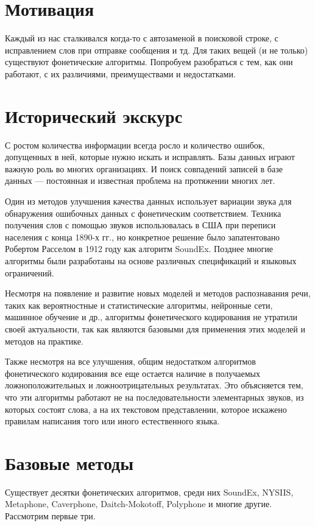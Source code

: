 \documentclass[titlepage,12pt]{article}
\begin{document}
\tableofcontents
\newpage
\section{Мотивация}
Каждый из нас сталкивался когда-то с автозаменой в поисковой строке, с исправлением слов при отправке сообщения и тд. Для таких вещей (и не только) существуют фонетические алгоритмы. Попробуем разобраться с тем, как они работают, с их различиями, преимуществами и недостатками.

\section{Исторический экскурс}

С ростом количества информации всегда росло и количество ошибок, допущенных в ней, которые нужно искать и исправлять. Базы данных играют важную роль во многих организациях. И поиск совпадений записей в базе данных --- постоянная и известная проблема на протяжении многих лет.

Один из методов улучшения качества данных использует вариации звука для обнаружения ошибочных данных с фонетическим соответствием. Техника
получения слов с помощью звуков использовалась в США при переписи населения с конца 1890-х гг., но конкретное решение было запатентовано Робертом Расселом в 1912 году как алгоритм SoundEx. Позднее многие алгоритмы были разработаны на основе различных спецификаций и языковых ограничений.

Несмотря на появление и развитие новых моделей и методов распознавания речи, таких как вероятностные и статистические алгоритмы, нейронные сети,
машинное обучение и др., алгоритмы фонетического кодирования не утратили своей актуальности, так как являются базовыми для применения этих моделей и методов на практике.

Также несмотря на все улучшения, общим недостатком алгоритмов фонетического кодирования все еще остается наличие в
получаемых ложноположительных и ложноотрицательных результатах. Это объясняется тем, что эти алгоритмы работают не на последовательности элементарных звуков, из которых состоят слова, а на их текстовом представлении, которое искажено правилам написания того или иного естественного языка. 
\newpage
\section{Базовые методы}

Существует десятки фонетических алгоритмов, среди них SoundEx, NYSIIS, Metaphone, Caverphone, Daitch-Mokotoff, Polyphone и многие другие. Рассмотрим первые три.
\end{document}
